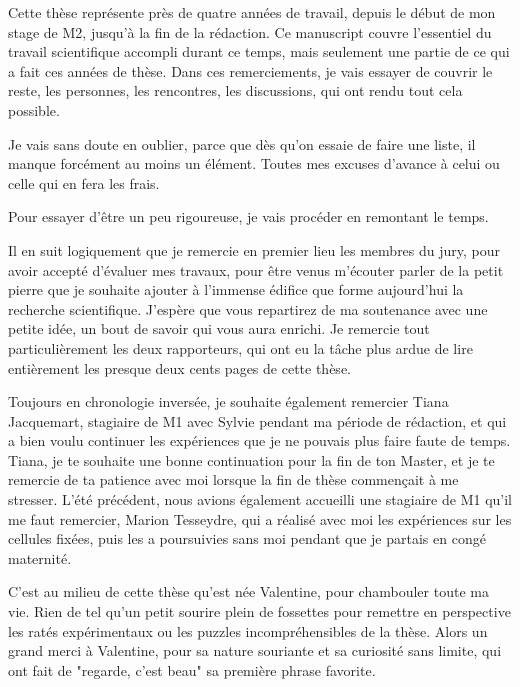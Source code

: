 Cette thèse représente près de quatre années de travail, depuis le début de mon stage de M2, jusqu'à la fin de la rédaction. Ce manuscript couvre l'essentiel du travail scientifique accompli durant ce temps, mais seulement une partie de ce qui a fait ces années de thèse. Dans ces remerciements, je vais essayer de couvrir le reste, les personnes, les rencontres, les discussions, qui ont rendu tout cela possible. 

Je vais sans doute en oublier, parce que dès qu'on essaie de faire une liste, il manque forcément au moins un élément. Toutes mes excuses d'avance à celui ou celle qui en fera les frais. 

Pour essayer d'être un peu rigoureuse, je vais procéder en remontant le temps. 

Il en suit logiquement que je remercie en premier lieu les membres du jury, pour avoir accepté d'évaluer mes travaux, pour être venus m'écouter parler de la petit pierre que je souhaite ajouter à l'immense édifice que forme aujourd'hui la recherche scientifique. 
J'espère que vous repartirez de ma soutenance avec une petite idée, un bout de savoir qui vous aura enrichi. 
Je remercie tout particulièrement les deux rapporteurs, qui ont eu la tâche plus ardue de lire entièrement les presque deux cents pages de cette thèse. 

Toujours en chronologie inversée, je souhaite également remercier Tiana Jacquemart, stagiaire de M1 avec Sylvie pendant ma période de rédaction, et qui a bien voulu continuer les expériences que je ne pouvais plus faire faute de temps. Tiana, je te souhaite une bonne continuation pour la fin de ton Master, et je te remercie de ta patience avec moi lorsque la fin de thèse commençait à me stresser. 
L'été précédent, nous avions également accueilli une stagiaire de M1 qu'il me faut remercier, Marion Tesseydre, qui a   réalisé avec moi les expériences sur les cellules fixées, puis les a poursuivies sans moi pendant que je partais en congé maternité.         

C'est au milieu de cette thèse qu'est née Valentine, pour chambouler toute ma vie. Rien de tel qu'un petit sourire plein de fossettes pour remettre en perspective les ratés expérimentaux ou les puzzles incompréhensibles de la thèse. Alors un grand merci à Valentine, pour sa nature souriante et sa curiosité sans limite, qui ont fait de "regarde, c'est beau" sa première phrase favorite. 

